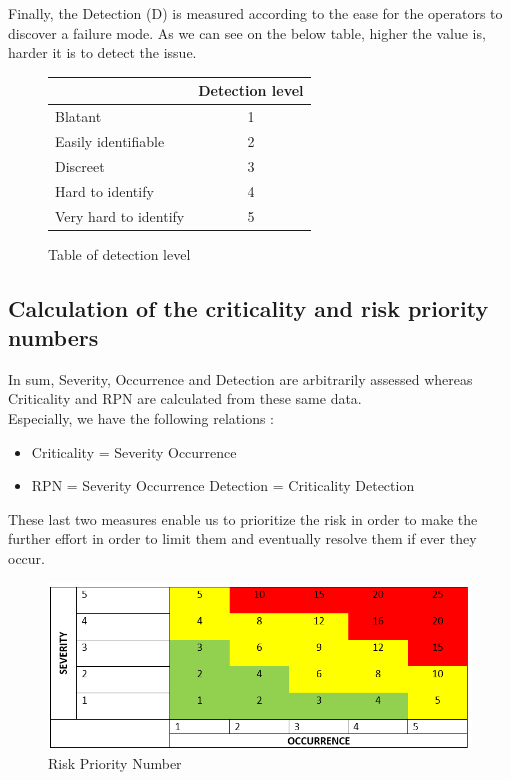 Finally, the Detection (D) is measured according to the ease for the operators to discover a failure mode. As we can see on the below table, higher the value is, harder it is to detect the issue.

\begin{figure}[h]
    \centering
    \begin{tabular}{| p{4cm} | c |}
        \hline
        \rowcolor{heading-color}\multicolumn{1}{|c|}{Detection definition} & Detection level\\
        \hline
        Blatant & 1  \\
        \hline
        Easily identifiable & 2  \\
        \hline
        Discreet & 3  \\
        \hline
        Hard to identify & 4 \\
        \hline
        Very  hard to identify & 5 \\
        \hline
    \end{tabular}
    \caption{Table of detection level}
\end{figure}

\subsection{Calculation of the criticality and risk priority numbers}

In sum, Severity, Occurrence and Detection are arbitrarily assessed whereas Criticality and RPN are calculated from these same data.\\

Especially, we have the following relations :
\begin{itemize}
    \item Criticality = Severity \* Occurrence
    \item RPN = Severity \* Occurrence \* Detection = Criticality \* Detection
\end{itemize}

These last two measures enable us to prioritize the risk in order to make the further effort in order to limit them and eventually resolve them if ever they occur.

\begin{figure}[h]
    \centering
    \includegraphics{Img/severity-occurrence.png}
    \caption{Risk Priority Number}
\end{figure}

